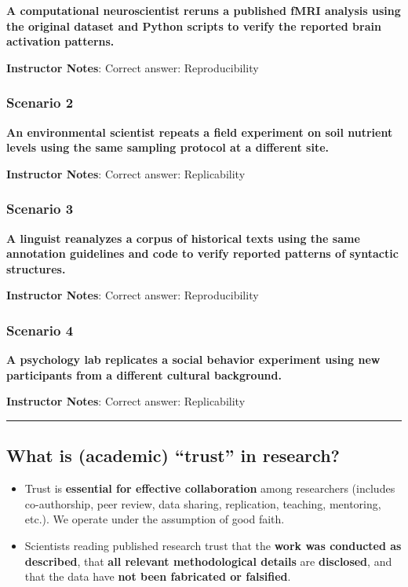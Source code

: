 \documentclass[
  english,
  letterpaper,
  DIV=11,
  numbers=noendperiod]{scrartcl}
\begin{document}
\textbf{A computational neuroscientist reruns a published fMRI analysis
using the original dataset and Python scripts to verify the reported
brain activation patterns.}

\textbf{Instructor Notes}: Correct answer: Reproducibility

\subsubsection{Scenario 2}

\textbf{An environmental scientist repeats a field experiment on soil
nutrient levels using the same sampling protocol at a different site.}

\textbf{Instructor Notes}: Correct answer: Replicability

\subsubsection{Scenario 3}

\textbf{A linguist reanalyzes a corpus of historical texts using the
same annotation guidelines and code to verify reported patterns of
syntactic structures.}

\textbf{Instructor Notes}: Correct answer: Reproducibility

\subsubsection{Scenario 4}

\textbf{A psychology lab replicates a social behavior experiment using
new participants from a different cultural background.}

\textbf{Instructor Notes}: Correct answer: Replicability

\begin{center}\rule{0.5\linewidth}{0.5pt}\end{center}

\subsection{What is (academic) ``trust'' in
research?}\label{what-is-academic-trust-in-research}

\begin{itemize}
\item
  Trust is \textbf{essential for effective collaboration} among
  researchers (includes co-authorship, peer review, data sharing,
  replication, teaching, mentoring, etc.). We operate under the
  assumption of good faith.
\item
  Scientists reading published research trust that the \textbf{work was
  conducted as described}, that \textbf{all relevant methodological
  details} are \textbf{disclosed}, and that the data have \textbf{not
  been fabricated or falsified}.
\end{itemize}
\end{document}
